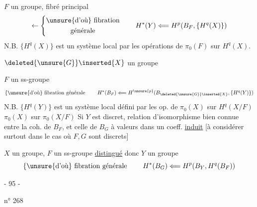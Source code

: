 $F$ un groupe, fibré principal
\[
\leftarrow\left\{\begin{gathered}\unsure{\text{d'où}}\ \text{fibration}\\\text{générale}\end{gathered}\right.
\qquad
H^*(Y)\Longleftarrow H^p(B_F,\{H^q(X)\})
\]
N.B. $\{H^q(X)\}$ est un système local  par les opérations de $\pi_0(F)$ sur $H^q(X)$.

$\deleted{\unsure{G}}\inserted{X}$ un groupe

$F$ un ss-groupe
\[
\left\{\unsure{\text{d'où}}\ \text{fibration générale}\right.
\qquad
H^*(B_F)\Longleftarrow H^{\unsure{p}}(B_{\deleted{\unsure{G}}\inserted{X}},\{H^q(Y)\})
\]
N.B. $\{H^q(Y)\}$ est un système local défini par les op. de $\pi_0(X)$ sur $H^q(X/F)$  $\pi_0(X)$ sur $\pi_0(X/F)$
Si $Y$ est discret, relation d'isomorphisme bien connue entre la coh. de $B_F$, et celle de $B_G$ à valeurs dans un coeff. \uline{induit} [à considérer surtout dans le cas où $F,G$ sont discrets]

$X$ un groupe, $F$ un ss-groupe \uline{distingué} donc $Y$ un groupe
\[
\left\{\unsure{\text{d'où}}\ \text{fibration générale}\right.
\qquad
H^*(B_G)\Longleftarrow H^p(B_Y,H^q(B_F))
\]
\begin{center}- 95 -\end{center}
n° 268


